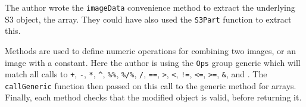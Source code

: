 The author wrote the \texttt{imageData} convenience method to extract
the underlying S3 object, the array. They could have also used the
\texttt{S3Part} function to extract this.

Methods are used to define numeric operations for combining two images,
or an image with a constant. Here the author is using the \texttt{Ops}
group generic which will match all calls to \texttt{+}, \texttt{-},
\texttt{*}, \texttt{\^{}}, \texttt{\%\%}, \texttt{\%/\%}, \texttt{/},
\texttt{==}, \texttt{\textgreater{}}, \texttt{\textless{}}, \texttt{!=},
\texttt{\textless{}=}, \texttt{\textgreater{}=}, \texttt{\&}, and
\texttt{\textbar{}}. The \texttt{callGeneric} function then passed on
this call to the generic method for arrays. Finally, each method checks
that the modified object is valid, before returning it.

\begin{Shaded}
\begin{Highlighting}[]
\NormalTok{(}\NormalTok{, }\NormalTok{(}\NormalTok{, }\NormalTok{),}
\NormalTok{(}
\NormalTok{    \}}
\NormalTok{)}
\NormalTok{(}\NormalTok{, }\NormalTok{(}\NormalTok{, }\NormalTok{),}
\NormalTok{(}
\NormalTok{    \}}
\NormalTok{)}
\NormalTok{(}\NormalTok{, }\NormalTok{(}\NormalTok{, }\NormalTok{),}
\NormalTok{    \}}
\NormalTok{)}
\end{Highlighting}
\end{Shaded}

